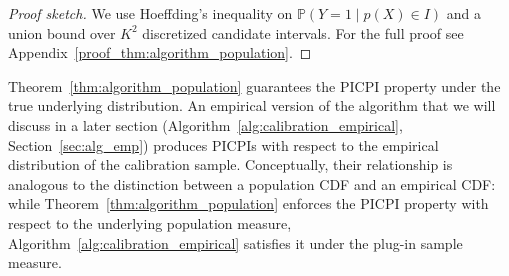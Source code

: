 \documentclass[11pt]{article}
\theoremstyle{statplain}
\newtheorem{theorem}{Theorem}[section]
\theoremstyle{statdefinition}
\newenvironment{proofsketch}
  {\begin{proof}[Proof sketch]\renewcommand{\qedsymbol}{}}
  {\end{proof}}
\newcommand{\PP}{\mathbb{P}}
\newcommand{\0}{\mathbf{0}}
\newcommand{\I}{\mathcal{I}}
\newcommand{\discreteNum}{K} %
\newcommand{\titleShort}{PICPI\xspace}
\newcommand{\titleShorts}{PICPIs\xspace}
\begin{document}
\begin{proofsketch}
We use Hoeffding's inequality on $\PP(Y=1\mid p(X)\in I)$ and a union bound over $\discreteNum^2$ discretized candidate intervals. For the full proof see Appendix~\ref{proof_thm:algorithm_population}.
\end{proofsketch}



Theorem~\ref{thm:algorithm_population} guarantees the PICPI property under the true underlying distribution. An empirical version of the algorithm that we will discuss in a later section (Algorithm~\ref{alg:calibration_empirical}, Section~\ref{sec:alg_emp}) produces PICPIs with respect to the empirical distribution of the calibration sample. 
Conceptually, their relationship is analogous to the distinction between a population CDF and an empirical CDF: while Theorem~\ref{thm:algorithm_population} enforces the PICPI property with respect to the  underlying population measure, Algorithm~\ref{alg:calibration_empirical} satisfies it under the plug-in sample measure.

\end{document}
